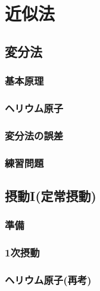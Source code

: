 \documentclass{report}
\begin{document}
  
  \maketitle
  \tableofcontents
  \chapter{近似法}
    \section{変分法}
      
      \subsection{基本原理}
        
      \subsection{ヘリウム原子}
        
      \subsection{変分法の誤差}
        
      \subsection{練習問題}
        
    \section{摂動I(定常摂動)}
      
      \subsection{準備}
        
      \subsection{1次摂動}
        
      \subsection{ヘリウム原子(再考)}
        
\end{document}
